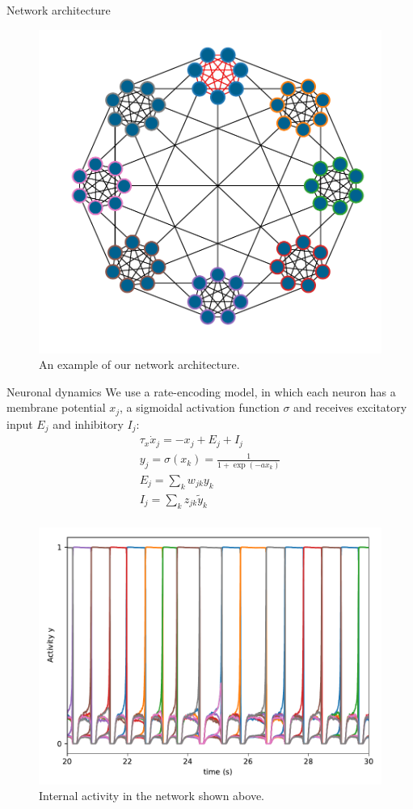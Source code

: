 \documentclass[final,hyperref={pdfpagelabels=false}]{beamer}
\begin{document}
\begin{frame}
\begin{columns}
\begin{column}{.30\textwidth}
\begin{minipage}[T]{.95\textwidth}
{\begin{block}{Network architecture}
							\begin{figure}
								\includegraphics[width=.8\linewidth]{network2.pdf}
								\caption{An example of our network architecture.}
								\label{fig:network}
							\end{figure}
						\end{block}		
										
						\vfill
						\begin{block}{Neuronal dynamics}
							We use a rate-encoding model, in which each neuron has a membrane potential $x_j$, a sigmoidal activation function $\sigma$ and receives excitatory input $E_j$ and inhibitory $I_j$:
							\begin{gather*}
								\tau_x \dot{x}_j = -x_j + E_j + I_j\\
								y_j = \sigma \left(x_k\right) = \frac{1}{1+\exp \left(-a x_k \right) } \\
								E_j = \sum_{k} w_{jk} y_k \\
								I_j = \sum_k z_{jk} \tilde{y}_k \\
								\label{eq:neuron}
							\end{gather*}
							\begin{figure}
								\includegraphics[width=.8\linewidth]{internal_activity}
								\caption{Internal activity in the network shown above.}
							\end{figure}
							

\end{block}}
\end{minipage}
\end{column}
\end{columns}
\end{frame}
\end{document}
